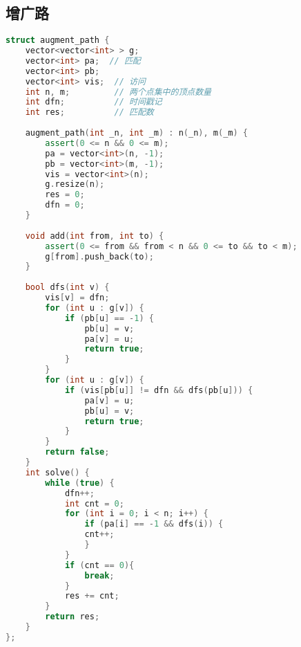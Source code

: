 \subsection{增广路}
\begin{lstlisting}[language=c++]
struct augment_path {
    vector<vector<int> > g;
    vector<int> pa;  // 匹配
    vector<int> pb;
    vector<int> vis;  // 访问
    int n, m;         // 两个点集中的顶点数量
    int dfn;          // 时间戳记
    int res;          // 匹配数
 
    augment_path(int _n, int _m) : n(_n), m(_m) {
        assert(0 <= n && 0 <= m);
        pa = vector<int>(n, -1);
        pb = vector<int>(m, -1);
        vis = vector<int>(n);
        g.resize(n);
        res = 0;
        dfn = 0;
    }
 
    void add(int from, int to) {
        assert(0 <= from && from < n && 0 <= to && to < m);
        g[from].push_back(to);
    }
 
    bool dfs(int v) {
        vis[v] = dfn;
        for (int u : g[v]) {
            if (pb[u] == -1) {
                pb[u] = v;
                pa[v] = u;
                return true;
            }
        }
        for (int u : g[v]) {
            if (vis[pb[u]] != dfn && dfs(pb[u])) {
                pa[v] = u;
                pb[u] = v;
                return true;
            }
        }
        return false;
    }
    int solve() {
        while (true) {
            dfn++;
            int cnt = 0;
            for (int i = 0; i < n; i++) {
                if (pa[i] == -1 && dfs(i)) {
                cnt++;
                }
            }
            if (cnt == 0){
                break;
            }
            res += cnt;
        }
        return res;
    }
};
\end{lstlisting}